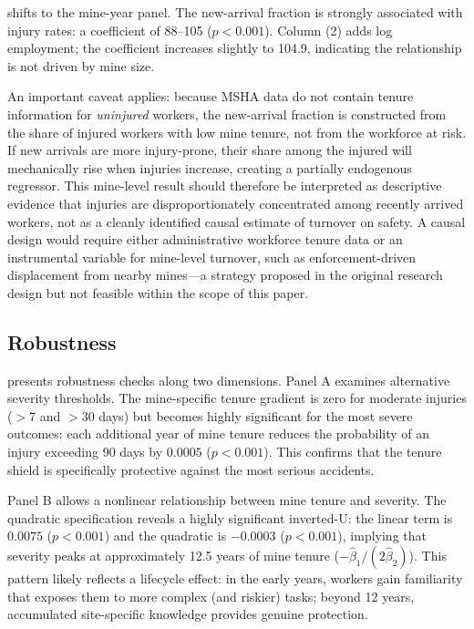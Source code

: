 \documentclass[12pt]{article}
\begin{document}


 shifts to the mine-year panel. The new-arrival fraction is strongly associated with injury rates: a coefficient of 88--105 ($p < 0.001$). Column (2) adds log employment; the coefficient increases slightly to 104.9, indicating the relationship is not driven by mine size.

An important caveat applies: because MSHA data do not contain tenure information for \textit{uninjured} workers, the new-arrival fraction is constructed from the share of injured workers with low mine tenure, not from the workforce at risk. If new arrivals are more injury-prone, their share among the injured will mechanically rise when injuries increase, creating a partially endogenous regressor. This mine-level result should therefore be interpreted as descriptive evidence that injuries are disproportionately concentrated among recently arrived workers, not as a cleanly identified causal estimate of turnover on safety. A causal design would require either administrative workforce tenure data or an instrumental variable for mine-level turnover, such as enforcement-driven displacement from nearby mines---a strategy proposed in the original research design but not feasible within the scope of this paper.

\subsection{Robustness}



 presents robustness checks along two dimensions. Panel A examines alternative severity thresholds. The mine-specific tenure gradient is zero for moderate injuries ($>$7 and $>$30 days) but becomes highly significant for the most severe outcomes: each additional year of mine tenure reduces the probability of an injury exceeding 90 days by $0.0005$ ($p < 0.001$). This confirms that the tenure shield is specifically protective against the most serious accidents.

Panel B allows a nonlinear relationship between mine tenure and severity. The quadratic specification reveals a highly significant inverted-U: the linear term is $0.0075$ ($p < 0.001$) and the quadratic is $-0.0003$ ($p < 0.001$), implying that severity peaks at approximately 12.5 years of mine tenure ($-\hat{\beta}_1 / (2\hat{\beta}_2)$). This pattern likely reflects a lifecycle effect: in the early years, workers gain familiarity that exposes them to more complex (and riskier) tasks; beyond 12 years, accumulated site-specific knowledge provides genuine protection.
\end{document}
